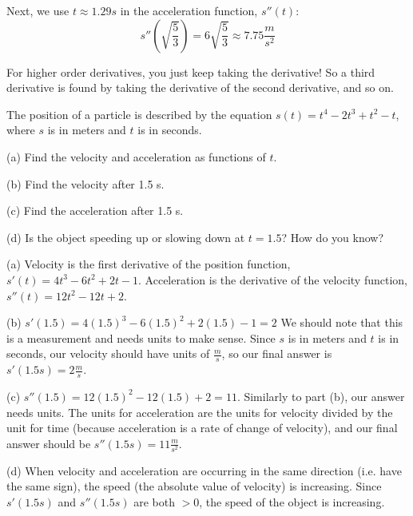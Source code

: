 Next, we use $t\approx 1.29s$ in the acceleration function, $s''(t)$:
$$s''(\sqrt{\frac{5}{3}}) = 6\sqrt{\frac{5}{3}} \approx 7.75 \frac{m}{s^2}$$

For higher order derivatives, you just keep taking the derivative! So a third derivative is found by taking the derivative of the second derivative, and so on. 
\begin{Exercise}[title=Using Derivatives to Describe Motion, label=diffpoly2]
The position of a particle is described by the equation $s(t) = t^4-2t^3+t^2-t$, where $s$ is in meters and $t$ is in seconds. 

(a) Find the velocity and acceleration as functions of $t$.

(b) Find the velocity after 1.5 s. 

(c) Find the acceleration after 1.5 s.

(d) Is the object speeding up or slowing down at $t=1.5$? How do you know? 

\end{Exercise}
\begin{Answer}[ref=diffpoly2]
(a) Velocity is the first derivative of the position function, $s'(t) = 4t^3-6t^2+2t-1$. Acceleration is the derivative of the velocity function, $s''(t) = 12t^2-12t+2$. 

(b) $s'(1.5) = 4(1.5)^3-6(1.5)^2+2(1.5)-1 = 2$ We should note that this is a measurement and needs units to make sense. Since $s$ is in meters and $t$ is in seconds, our velocity should have units of $\frac{m}{s}$, so our final answer is $s'(1.5s) = 2\frac{m}{s}$. 

(c) $s''(1.5) = 12(1.5)^2-12(1.5)+2 = 11$. Similarly to part (b), our answer needs units. The units for acceleration are the units for velocity divided by the unit for time (because acceleration is a rate of change of velocity), and our final answer should be $s''(1.5s) = 11\frac{m}{s^2}$.

(d) When velocity and acceleration are occurring in the same direction (i.e. have the same sign), the speed (the absolute value of velocity) is increasing. Since $s'(1.5s)$ and $s''(1.5s)$ are both $>0$, the speed of the object is increasing. 
\end{Answer}

